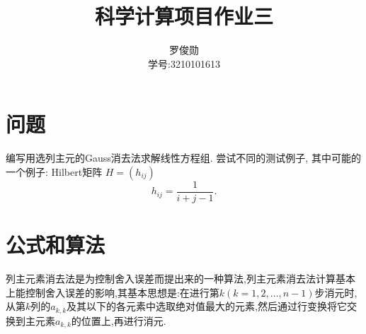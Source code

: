 \documentclass[12pt, a4paper, oneside]{ctexart}
\title{\huge\textbf{科学计算项目作业三}}
\author{罗俊勋\\学号:3210101613}
\begin{document}
\maketitle

\section*{问题}

编写用选列主元的Gauss消去法求解线性方程组.
尝试不同的测试例子, 其中可能的一个例子: Hilbert矩阵 $H=\left(h_{i j}\right)$
$$
h_{i j}=\frac{1}{i+j-1} .
$$

\section*{公式和算法}
列主元素消去法是为控制舍入误差而提出来的一种算法,列主元素消去法计算基本上能控制舍入误差的影响,其基本思想是:在进行第$k(k=1,2,…,n-1)$步消元时,
从第$k$列的$a_{k,k}$及其以下的各元素中选取绝对值最大的元素,然后通过行变换将它交换到主元素$a_{k,k}$的位置上,再进行消元.

\pagebreak
\end{document}
